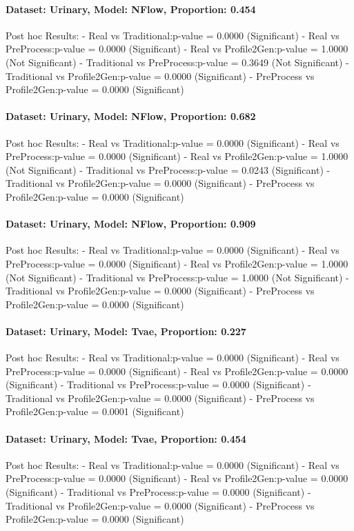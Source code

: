\documentclass{article}
\theoremstyle{plain}
\theoremstyle{definition}
\theoremstyle{remark}
\begin{document}
\paragraph{Dataset: Urinary, Model: NFlow, Proportion: 0.454
}Post hoc Results:
- Real vs Traditional:p-value = 0.0000 (Significant)
- Real vs PreProcess:p-value = 0.0000 (Significant)
- Real vs Profile2Gen:p-value = 1.0000 (Not Significant)
- Traditional vs PreProcess:p-value = 0.3649 (Not Significant)
- Traditional vs Profile2Gen:p-value = 0.0000 (Significant)
- PreProcess vs Profile2Gen:p-value = 0.0000 (Significant)

\paragraph{Dataset: Urinary, Model: NFlow, Proportion: 0.682
}Post hoc Results:
- Real vs Traditional:p-value = 0.0000 (Significant)
- Real vs PreProcess:p-value = 0.0000 (Significant)
- Real vs Profile2Gen:p-value = 1.0000 (Not Significant)
- Traditional vs PreProcess:p-value = 0.0243 (Significant)
- Traditional vs Profile2Gen:p-value = 0.0000 (Significant)
- PreProcess vs Profile2Gen:p-value = 0.0000 (Significant)

\paragraph{Dataset: Urinary, Model: NFlow, Proportion: 0.909
}Post hoc Results:
- Real vs Traditional:p-value = 0.0000 (Significant)
- Real vs PreProcess:p-value = 0.0000 (Significant)
- Real vs Profile2Gen:p-value = 1.0000 (Not Significant)
- Traditional vs PreProcess:p-value = 1.0000 (Not Significant)
- Traditional vs Profile2Gen:p-value = 0.0000 (Significant)
- PreProcess vs Profile2Gen:p-value = 0.0000 (Significant)

\paragraph{Dataset: Urinary, Model: Tvae, Proportion: 0.227
}Post hoc Results:
- Real vs Traditional:p-value = 0.0000 (Significant)
- Real vs PreProcess:p-value = 0.0000 (Significant)
- Real vs Profile2Gen:p-value = 0.0000 (Significant)
- Traditional vs PreProcess:p-value = 0.0000 (Significant)
- Traditional vs Profile2Gen:p-value = 0.0000 (Significant)
- PreProcess vs Profile2Gen:p-value = 0.0001 (Significant)

\paragraph{Dataset: Urinary, Model: Tvae, Proportion: 0.454
}Post hoc Results:
- Real vs Traditional:p-value = 0.0000 (Significant)
- Real vs PreProcess:p-value = 0.0000 (Significant)
- Real vs Profile2Gen:p-value = 0.0000 (Significant)
- Traditional vs PreProcess:p-value = 0.0000 (Significant)
- Traditional vs Profile2Gen:p-value = 0.0000 (Significant)
- PreProcess vs Profile2Gen:p-value = 0.0000 (Significant)
\end{document}
